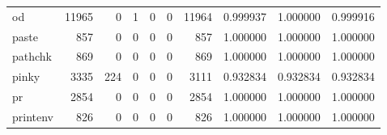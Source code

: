 \begin{tabular}{lrrrrrrrrr}
od        &                               11965 &                                               0 &                                              1 &                                             0 &                                              0 &                                        11964 &                                           0.999937 &                               1.000000 &                             0.999916 \\
paste     &                                 857 &                                               0 &                                              0 &                                             0 &                                              0 &                                          857 &                                           1.000000 &                               1.000000 &                             1.000000 \\
pathchk   &                                 869 &                                               0 &                                              0 &                                             0 &                                              0 &                                          869 &                                           1.000000 &                               1.000000 &                             1.000000 \\
pinky     &                                3335 &                                             224 &                                              0 &                                             0 &                                              0 &                                         3111 &                                           0.932834 &                               0.932834 &                             0.932834 \\
pr        &                                2854 &                                               0 &                                              0 &                                             0 &                                              0 &                                         2854 &                                           1.000000 &                               1.000000 &                             1.000000 \\
printenv  &                                 826 &                                               0 &                                              0 &                                             0 &                                              0 &                                          826 &                                           1.000000 &                               1.000000 &                             1.000000 \\

\end{tabular}
